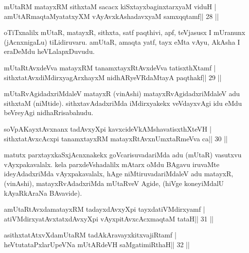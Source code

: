 \begin{shl}
mUtaRM matayxRM sithxtaM sacacx kiSxtayxbaginxtarxyaM viduH |
amUtARmaqtaMyatatxyXM vAyAvxkAshadavxyaM samxqqtamf\hfill || 28 ||
\end{shl}

\begin{artha}
oTiTxnalilx mUtaR, matayxR, sithxta, satf paqthivi, apf, teVjasusx I mUranunx (jAcnxnigaLu) tiLidiruvaru. amUtaR, amaqta yatf, tayx eMta vAyu, AkAsha I eraDeMdu heVLalapxDuvudu.
\end{artha}



\begin{shl}
mUtaRtAvxdeVva matayxRM tanamxtayxRtAvxdeVva tatisxthXtamf |
sithxtatAvxdiMdirxyagArxhayxM nidhARyeVRdaMtayA paqthakf\hfill || 29 ||
\end{shl}

\begin{artha}
mUtaRvAgidadxriMdaleV matayxR (vinAshi) matayxRvAgidadxriMdaleV adu sithxtaM (niMtide). sithxtavAdadxriMda iMdirxyakekx veVdayxvAgi idu eMdu beVreyAgi nidhaRrisabahudu.
\end{artha}



\begin{shl}
soVpAKayxtAvxnanx tadAvxyXpi kavxcideVkAMshavatisxthXteVH |
sithxtatAvxcAcxpi tanamxtayxRM matayxRtAvxnUmxtaRmeVva ca\hfill || 30 ||
\end{shl}

\begin{artha}
matutx parxtayxkaSxjAcnxnakekx goVcarisuvadariMda adu (mUtaR) vasutxvu vAyxpakavalalx. kela parxdeVshadalilx mAtarx oMdu BAgavu iruvaMte  ideyAdadxriMda vAyxpakavalalx, hAge niMtiruvadariMdaleV adu matayxR, (vinAshi), matayxRvAdadxriMda mUtaRveV Agide, (hiVge koneyiMdalU kAyaRkAraNa BAvavide).
\end{artha}



\begin{shl}
amUtaRtAvxdamatayxRM tadayxdAvxyXpi tayxdatiVMdirxyamf |
atiVMdirxyatAvxtatxdAvxyXpi vAyxpitAvxcAcxmaqtaM tataH\hfill || 31 ||
\end{shl}

\begin{shl}
asithxtatAtxvXdamUtaRM tadAkAravayxkitxvajiRtamf |
heVtutataPxlarUpeVNa mUtARdeVH saMgatimiRthaH\hfill || 32 ||
\end{shl}

